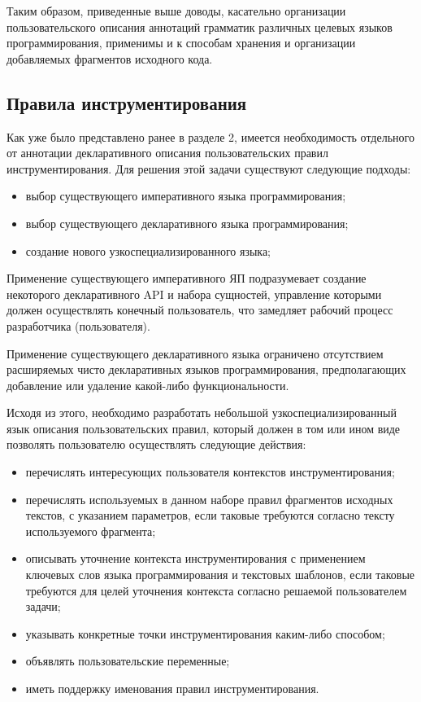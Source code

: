 Таким образом, приведенные выше доводы, касательно организации пользовательского описания аннотаций грамматик различных целевых языков программирования, применимы и к способам хранения и организации добавляемых фрагментов исходного кода.

\subsection{Правила инструментирования}

Как уже было представлено ранее в разделе 2, имеется необходимость отдельного от аннотации декларативного описания пользовательских правил инструментирования.
Для решения этой задачи существуют следующие подходы:
\begin{itemize}[noitemsep]
  \item выбор существующего императивного языка программирования;
  \item выбор существующего декларативного языка программирования;
  \item создание нового узкоспециализированного языка;
\end{itemize}

Применение существующего императивного ЯП подразумевает создание некоторого декларативного API и набора сущностей, управление которыми должен осуществлять конечный пользователь, что замедляет рабочий процесс разработчика (пользователя).

Применение существующего декларативного языка ограничено отсутствием расширяемых чисто декларативных языков программирования, предполагающих добавление или удаление какой-либо функциональности.

Исходя из этого, необходимо разработать небольшой узкоспециализированный язык описания пользовательских правил, который должен в том или ином виде позволять пользователю осуществлять следующие действия:
\begin{itemize}[noitemsep]
  \item перечислять интересующих пользователя контекстов инструментирования;
  \item перечислять используемых в данном наборе правил фрагментов исходных текстов, с указанием параметров, если таковые требуются согласно тексту используемого фрагмента;
  \item описывать уточнение контекста инструментирования с применением ключевых слов языка программирования и текстовых шаблонов, если таковые требуются для целей уточнения контекста согласно решаемой пользователем задачи;
  \item указывать конкретные точки инструментирования каким-либо способом;
  \item объявлять пользовательские переменные;
  \item иметь поддержку именования правил инструментирования.
\end{itemize}

